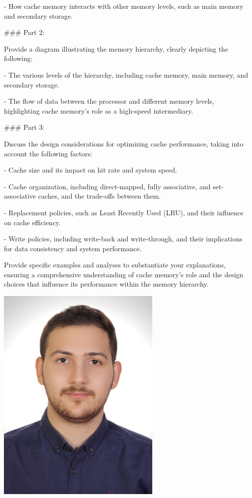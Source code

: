 \documentclass{article}%
\begin{document}
- How cache memory interacts with other memory levels, such as main memory and secondary storage. 

### Part 2: 

Provide a diagram illustrating the memory hierarchy, clearly depicting the following: 

- The various levels of the hierarchy, including cache memory, main memory, and secondary storage. 

- The flow of data between the processor and different memory levels, highlighting cache memory's role as a high-speed intermediary. 

### Part 3: 

Discuss the design considerations for optimizing cache performance, taking into account the following factors: 

- Cache size and its impact on hit rate and system speed. 

- Cache organization, including direct-mapped, fully associative, and set-associative caches, and the trade-offs between them. 

- Replacement policies, such as Least Recently Used (LRU), and their influence on cache efficiency. 

- Write policies, including write-back and write-through, and their implications for data consistency and system performance. 

Provide specific examples and analyses to substantiate your explanations, ensuring a comprehensive understanding of cache memory's role and the design choices that influence its performance within the memory hierarchy.%
\begin{center}%
\includegraphics[width=8cm]{./questionattachments/46993.jpg}%
\end{center}
\end{document}
